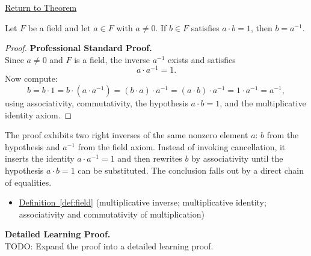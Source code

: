 \newpage
{}
\label{prf:uniqueness-of-multiplicative-inverse}

\begin{remark*}[Return]
\hyperref[thm:uniqueness-of-multiplicative-inverse]{Return to Theorem}
\end{remark*}

\begin{theorem*}
Let $F$ be a field and let $a\in F$ with $a\neq 0$.  If $b\in F$
satisfies $a\cdot b = 1$, then $b = a^{-1}$.
\end{theorem*}

\begin{proof}
\textbf{Professional Standard Proof.}~\\
Since $a\neq 0$ and $F$ is a field, the inverse $a^{-1}$ exists and satisfies
\[
a\cdot a^{-1}=1.
\]
Now compute:
\[
b=b\cdot 1=b\cdot(a\cdot a^{-1})=(b\cdot a)\cdot a^{-1}=(a\cdot b)\cdot a^{-1}=1\cdot a^{-1}=a^{-1},
\]
using associativity, commutativity, the hypothesis $a\cdot b=1$, and the
multiplicative identity axiom.
\end{proof}

\begin{remark*}
The proof exhibits two right inverses of the same nonzero element $a$:
$b$ from the hypothesis and $a^{-1}$ from the field axiom.  Instead of
invoking cancellation, it inserts the identity $a\cdot a^{-1}=1$ and then
rewrites $b$ by associativity until the hypothesis $a\cdot b=1$ can be
substituted.  The conclusion falls out by a direct chain of equalities.
\end{remark*}

\begin{dependencies}
\begin{itemize}
  \item \hyperref[def:field]{Definition~\ref*{def:field}}
        \textnormal{(multiplicative inverse; multiplicative identity; associativity and commutativity of multiplication)}
\end{itemize}
\end{dependencies}

\textbf{Detailed Learning Proof.}~\\
TODO: Expand the proof into a detailed learning proof.


